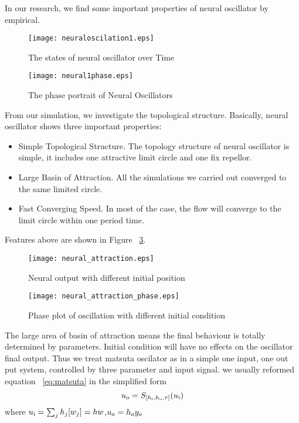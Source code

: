 In our research, we find some important properties of neural oscillator by empirical.

\begin{figure}
\begin{center}
\texttt{[image: neuraloscilation1.eps]}
\end{center}
\caption{The states of neural oscillator over Time}
\label{fig:oscilation}
\end{figure}

\begin{figure}
\begin{center}
\texttt{[image: neural1phase.eps]}
\end{center}
\caption{The phase portrait of Neural Oscillators}
\label{fig:oscilationphase}
\end{figure}

From our simulation, we investigate the topological structure.
Basically, neural oscillator shows three important properties:
\begin{itemize}
\item{Simple Topological Structure.}
The topology structure of neural oscillator is simple, 
it includes one  attractive limit circle and one fix repellor.
\item{Large Basin of Attraction.}
All the simulations we carried out converged to the same limited circle.
\item{Fast Converging Speed.}
In most of the case, the flow will converge to the limit circle within one period time.
\end{itemize}

Features above are shown in Figure ~\ref{fig:time_timeAttraction}.
\begin{figure}
\begin{center}
\texttt{[image: neural\_attraction.eps]}
\end{center}
\caption{Neural output with different initial position}
\label{fig:time_timeAttraction}
\end{figure}

\begin{figure}
\begin{center}
\texttt{[image: neural\_attraction\_phase.eps]}
\end{center}
\caption{Phase plot of oscillation with different initial condition}
\label{fig:phase_attraction}
\end{figure}
 
The large area of basin of attraction means the final behaviour is totally determined by parameters. 
Initial condition will have no effects on the oscillator final output. 
Thus we treat matsuta oscilator as in a simple one input, one out put system, controlled by three parameter and input signal. 
we usually reformed equation ~\ref{eq:matsuta} in the simplified form
\begin{equation}
u_{\mathrm{o}}=S_{[h_{\mathrm{i}},h_{\mathrm{o}},\tau]}(u_{\mathrm{i}})
\label{eq:simplematsuta}
\end{equation}
where $u_{\mathrm{i}}=\sum_{j}h_{j}[w_{j}]=hw$,$u_{\mathrm{o}}=h_{\mathrm{o}} y_{o}$





